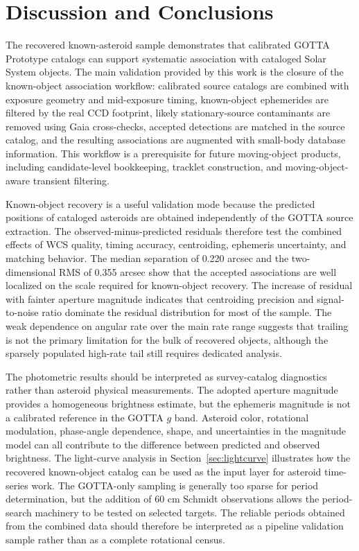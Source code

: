\documentclass[referee]{raa}
\begin{document}
\FloatBarrier

\section{Discussion and Conclusions}
\label{sec:discussion}

The recovered known-asteroid sample demonstrates that calibrated GOTTA Prototype catalogs can support systematic association with cataloged Solar System objects. The main validation provided by this work is the closure of the known-object association workflow: calibrated source catalogs are combined with exposure geometry and mid-exposure timing, known-object ephemerides are filtered by the real CCD footprint, likely stationary-source contaminants are removed using Gaia cross-checks, accepted detections are matched in the source catalog, and the resulting associations are augmented with small-body database information. This workflow is a prerequisite for future moving-object products, including candidate-level bookkeeping, tracklet construction, and moving-object-aware transient filtering.

Known-object recovery is a useful validation mode because the predicted positions of cataloged asteroids are obtained independently of the GOTTA source extraction. The observed-minus-predicted residuals therefore test the combined effects of WCS quality, timing accuracy, centroiding, ephemeris uncertainty, and matching behavior. The median separation of 0.220 arcsec and the two-dimensional RMS of 0.355 arcsec show that the accepted associations are well localized on the scale required for known-object recovery. The increase of residual with fainter aperture magnitude indicates that centroiding precision and signal-to-noise ratio dominate the residual distribution for most of the sample. The weak dependence on angular rate over the main rate range suggests that trailing is not the primary limitation for the bulk of recovered objects, although the sparsely populated high-rate tail still requires dedicated analysis.

The photometric results should be interpreted as survey-catalog diagnostics rather than asteroid physical measurements. The adopted aperture magnitude provides a homogeneous brightness estimate, but the ephemeris magnitude is not a calibrated reference in the GOTTA $g$ band. Asteroid color, rotational modulation, phase-angle dependence, shape, and uncertainties in the magnitude model can all contribute to the difference between predicted and observed brightness. The light-curve analysis in Section~\ref{sec:lightcurve} illustrates how the recovered known-object catalog can be used as the input layer for asteroid time-series work. The GOTTA-only sampling is generally too sparse for period determination, but the addition of 60 cm Schmidt observations allows the period-search machinery to be tested on selected targets. The reliable periods obtained from the combined data should therefore be interpreted as a pipeline validation sample rather than as a complete rotational census.
\end{document}
